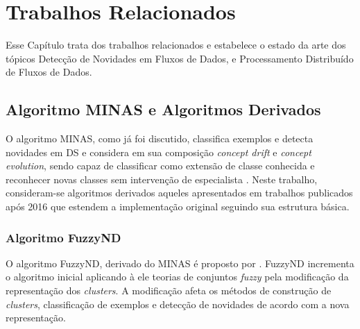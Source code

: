 \chapter{Trabalhos Relacionados}
\label{cha:related}



Esse Capítulo trata dos trabalhos relacionados e estabelece o estado da arte
dos tópicos Detecção de Novidades em Fluxos de Dados, e 
Processamento Distribuído de Fluxos de Dados.

\section{Algoritmo MINAS e Algoritmos Derivados}

\newcommand{\cluster}{\emph{cluster}\xspace}
\newcommand{\clusters}{\emph{clusters}\xspace}
\newcommand{\dataset}{\emph{data set}\xspace}
\newcommand{\datasets}{\emph{data sets}\xspace}

O algoritmo MINAS, como já foi discutido, classifica exemplos e detecta
novidades em DS e considera em sua composição \emph{concept drift} e
\emph{concept evolution}, sendo capaz de classificar como extensão de classe
conhecida e reconhecer novas classes sem intervenção de especialista
\cite{Faria2016minas}. Neste trabalho, consideram-se algoritmos derivados
aqueles apresentados em trabalhos publicados após 2016 que estendem a
implementação original seguindo sua estrutura básica.

\subsection*{Algoritmo FuzzyND}


O algoritmo FuzzyND, derivado do MINAS é proposto por .
FuzzyND incrementa o algoritmo inicial aplicando à ele teorias de
conjuntos \emph{fuzzy} pela modificação da representação dos \clusters.
A modificação afeta os métodos de construção de \clusters, classificação
de exemplos e detecção de novidades de acordo com a nova representação.

